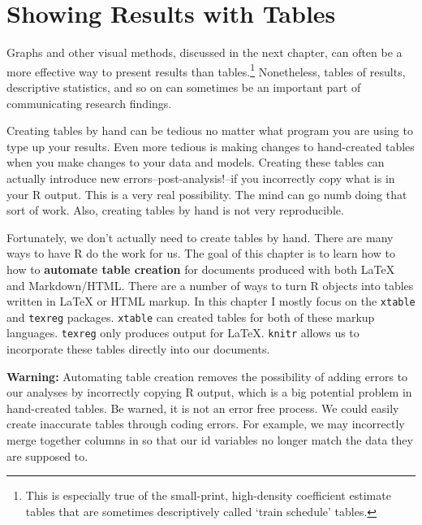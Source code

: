 



\chapter{Showing Results with Tables}\label{TablesChapter}

Graphs and other visual methods, discussed in the next chapter, can often be a more effective way to present results than tables.\footnote{This is especially true of the small-print, high-density coefficient estimate tables that are sometimes descriptively called `train schedule' tables.} Nonetheless, tables of results, descriptive statistics, and so on can sometimes be an important part of communicating research findings.

Creating tables by hand can be tedious no matter what program you are
using to type up your results. Even more tedious is making changes to
hand-created tables when you make changes to your data and models.
Creating these tables can actually introduce new
errors--post-analysis!--if you incorrectly copy what is in your
R output. This is a very real possibility. The mind can go numb
doing that sort of work. Also, creating tables by hand is not very
reproducible.

Fortunately, we don't actually need to create tables by hand. There are
many ways to have R do the work for us. The goal of this
chapter is to learn how to how to \textbf{automate table creation} for
documents produced with both LaTeX and Markdown/HTML. There are a
number of ways to turn R objects into tables written in
LaTeX or HTML markup. In this chapter I mostly focus on the
\texttt{xtable} and \texttt{texreg} packages. \texttt{xtable} can
created tables for both of these markup languages. \texttt{texreg} only
produces output for LaTeX. \texttt{knitr} allows us to incorporate
these tables directly into our documents.

\textbf{Warning:} Automating table creation removes the possibility of
adding errors to our analyses by incorrectly copying R output,
which is a big potential problem in hand-created tables. Be warned, it
is not an error free process. We could easily create inaccurate tables
through coding errors. For example, we may incorrectly merge together
columns in so that our id variables no longer match the data they are
supposed to.

